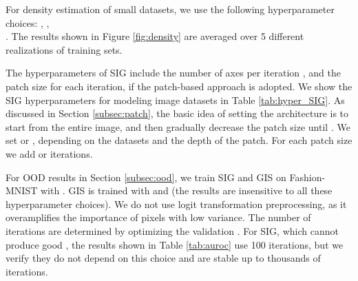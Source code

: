 \documentclass{article}
\begin{document}
For density estimation of small datasets, we use the following hyperparameter choices: , ,\\ . The results shown in Figure \ref{fig:density} are averaged over 5 different realizations of training sets.

The hyperparameters of SIG include the number of axes per iteration , and the patch size for each iteration, if the patch-based approach is adopted. We show the SIG hyperparameters for modeling image datasets in Table \ref{tab:hyper_SIG}. As discussed in Section \ref{subsec:patch}, the basic idea of setting the architecture is to start from the entire image, and then gradually decrease the patch size until . We set  or , depending on the datasets and the depth of the patch. For each patch size we add  or  iterations.

For OOD results in Section \ref{subsec:ood}, we train SIG and GIS on Fashion-MNIST with . GIS is trained with  and  (the results are insensitive to all these hyperparameter choices). We do not use logit transformation preprocessing, as it overamplifies the importance of pixels with low variance. The number of iterations are determined by optimizing the validation . For SIG, which cannot produce good , 
the results shown in Table \ref{tab:auroc} use 100 iterations, but we verify they do not depend on this choice and are stable up to thousands of iterations. 
\end{document}
